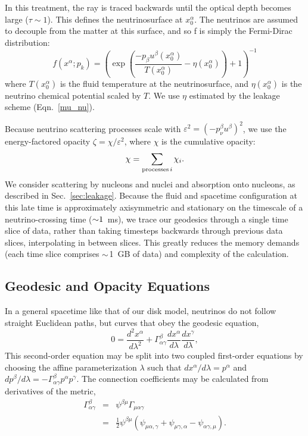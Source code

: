 In this treatment, the ray is traced backwards until the optical depth becomes
large ($\tau\sim1$). This defines the neutrinosurface at $x_0^\alpha$. The
neutrinos are assumed to decouple from the matter at this surface, and so f
is simply the Fermi-Dirac distribution:
\begin{equation}
  \label{eqn:f_fermi_dirac}
  f(x^\alpha;p_k) =
  \left(\exp\left(\frac{-p_\beta u^\beta(x_0^\alpha)}{T(x_0^\alpha)}
  -\eta(x_0^\alpha) \right)+1\right)^{-1}
\end{equation}
where $T(x_0^\alpha)$ is the fluid temperature at the neutrinosurface, and
$\eta(x_0^\alpha)$ is the neutrino chemical potential scaled by $T$.
We use $\eta$ estimated by the leakage scheme (Eqn.~\ref{mu_nu}).

Because neutrino scattering processes scale with
$\varepsilon^2=(-p_{\nu}^\beta u^\beta)^2$,
we use the energy-factored opacity $\zeta=\chi/\varepsilon^2$, where $\chi$ is
the cumulative opacity:
\begin{equation}
  \chi = \sum\limits_{{\rm processes}\, i} \chi_i.
\end{equation}
We consider scattering by nucleons and nuclei and absorption onto nucleons,
as described in Sec.~\ref{sec:leakage}.
Because the fluid and spacetime configuration at this late time is approximately
axisymmetric and stationary on the timescale of a neutrino-crossing time
($\mathord{\sim}1$~ms), we trace our geodesics through a single time slice of data,
rather than taking timesteps backwards through previous data slices,
interpolating in between slices. This greatly reduces the memory demands (each
time slice comprises $\mathord{\sim}$1~GB of data) and complexity of the calculation.

\subsection{Geodesic and Opacity Equations}
\label{ssec:geodesic}
In a general spacetime like that of our disk model, neutrinos do not follow
straight Euclidean paths, but curves that obey the geodesic equation,
\begin{equation}
  \label{eqn:geodesic}
  0=\frac{d^2x^\alpha}{d\lambda^2} + \Gamma^\beta_{\alpha\gamma}
  \frac{dx^\alpha}{d\lambda}\frac{dx^\gamma}{d\lambda},
\end{equation}
This second-order equation may be split into two coupled first-order equations
by choosing the affine parameterization $\lambda$ such that
$dx^\alpha/d\lambda=p^\alpha$ and
$dp^\beta/d\lambda=-\Gamma^\beta_{\alpha\gamma}p^\alpha p^\gamma$.
The connection coefficients may be calculated from derivatives of the metric,
\begin{eqnarray}
  \label{eqn:christoffel}
  \Gamma^\beta_{\alpha\gamma}
  &=& \psi^{\beta\mu}\Gamma_{\mu\alpha\gamma} \nonumber \\
  &=& \frac{1}{2} \psi^{\beta\mu}
  (\psi_{\mu\alpha,\gamma} + \psi_{\mu\gamma,\alpha} - \psi_{\alpha\gamma,\mu}).
\end{eqnarray}

